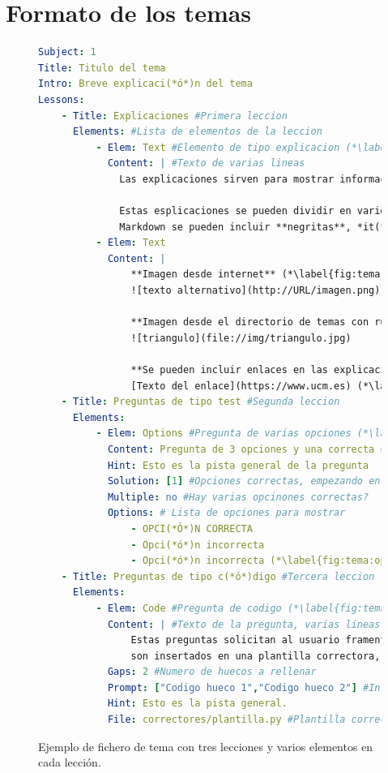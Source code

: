 \documentclass[]{article}
\begin{document}
\section{Formato de los temas}
\begin{figure}[tbp]
\begin{lstlisting}[language=yaml,basicstyle=\ttfamily\footnotesize]
Subject: 1
Title: Titulo del tema
Intro: Breve explicaci(*ó*)n del tema
Lessons:
    - Title: Explicaciones #Primera leccion
      Elements: #Lista de elementos de la leccion
          - Elem: Text #Elemento de tipo explicacion (*\label{fig:tema:explicacion}*)
            Content: | #Texto de varias lineas
              Las explicaciones sirven para mostrar informaci(*ó*)n al alumno. (*\label{fig:tema:exp1}*)

              Estas esplicaciones se pueden dividir en varios p(*á*)rrafos, y con 
              Markdown se pueden incluir **negritas**, *it(*a*)licas* y `c(*ó*)digo`. (*\label{fig:tema:exp2}*)
          - Elem: Text
            Content: |
                **Imagen desde internet** (*\label{fig:tema:exp3}*)
                ![texto alternativo](http://URL/imagen.png)

                **Imagen desde el directorio de temas con ruta relativa**
                ![triangulo](file://img/triangulo.jpg)
  
                **Se pueden incluir enlaces en las explicaciones:**
                [Texto del enlace](https://www.ucm.es) (*\label{fig:tema:exp4}*)
    - Title: Preguntas de tipo test #Segunda leccion
      Elements:
          - Elem: Options #Pregunta de varias opciones (*\label{fig:tema:opt1}*)
            Content: Pregunta de 3 opciones y una correcta #Texto de la pregunta
            Hint: Esto es la pista general de la pregunta
            Solution: [1] #Opciones correctas, empezando en 1
            Multiple: no #Hay varias opcinones correctas?
            Options: # Lista de opciones para mostrar
                - OPCI(*Ó*)N CORRECTA
                - Opci(*ó*)n incorrecta
                - Opci(*ó*)n incorrecta (*\label{fig:tema:opt2}*)
    - Title: Preguntas de tipo c(*ó*)digo #Tercera leccion
      Elements:
          - Elem: Code #Pregunta de codigo (*\label{fig:tema:code1}*)
            Content: | #Texto de la pregunta, varias lineas
                Estas preguntas solicitan al usuario framentos de c(*ó*)digo que
                son insertados en una plantilla correctora, que es evaluada.
            Gaps: 2 #Numero de huecos a rellenar
            Prompt: ["Codigo hueco 1","Codigo hueco 2"] #Informacion de cada hueco
            Hint: Esto es la pista general. 
            File: correctores/plantilla.py #Plantilla correctora con 'huecos' (*\label{fig:tema:code2}*)
\end{lstlisting}
\caption{Ejemplo de fichero de tema con tres lecciones y varios elementos en cada lección.\label{fig:tema}}
\end{figure}
\end{document}
